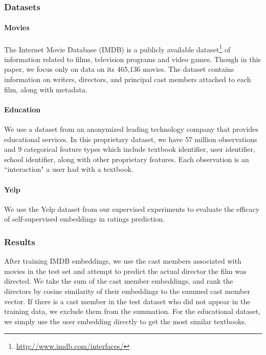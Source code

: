 \documentclass{article}
\begin{document}
\subsubsection{Datasets}

\paragraph{Movies}
The Internet Movie Database (IMDB) is a publicly available dataset\footnote{\href{http://www.imdb.com/interfaces/}{http://www.imdb.com/interfaces/}} of information related to films, television programs and video games.
Though in this paper, we focus only on data on its 465,136 movies.
The dataset contains information on writers, directors, and principal cast members attached to each film, along with  metadata.


\paragraph{Education}
We use a dataset from an anonymized leading technology company that provides educational services.
In this proprietary dataset, we have 57  million observations and 9 categorical feature types which include textbook identifier, user identifier, school identifier,
along with other proprietary features.
Each observation is an ``interaction" a user had with a textbook.

\paragraph{Yelp}
We use the Yelp dataset from our supervised experiments to evaluate the efficacy of self-supervised embeddings in ratings prediction.







\subsubsection{Results}

After training IMDB embeddings, we use the cast members associated with movies in the test set and  attempt to predict the actual director the film was directed.
We take the sum of the cast member embeddings, and rank the directors by cosine similarity of their embeddings to the summed cast member vector.
If there is a cast member in the test dataset who did not appear in the training data, we exclude them from the summation.
For the educational dataset, we simply use the user embedding directly to get the most similar textbooks.
\end{document}

